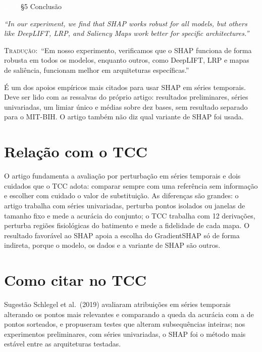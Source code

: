 \documentclass[11pt,a4paper]{article}
\newcommand{\pagechip}[1]{{\setlength{\fboxsep}{1.5pt}\colorbox{cAcc}{\textcolor{white}{\scriptsize\texttt{#1}}}}}
\newenvironment{origquote}{\par\itshape\small}{\par}
\newenvironment{tradquote}{\par\small\textsc{Tradução:}\ }{\par}
\newcommand{\explab}[1]{\par\smallskip{\small\color{cAcc}\textbf{\MakeUppercase{#1}}}\par}
\begin{document}
\begin{citacard}{\pagechip{p. 4} §5 Conclusão}
\begin{origquote}“In our experiment, we find that SHAP works robust for all models, but others like DeepLIFT, LRP, and Saliency Maps work better for specific architectures.”\end{origquote}
\begin{tradquote}“Em nosso experimento, verificamos que o SHAP funciona de forma robusta em todos os modelos, enquanto outros, como DeepLIFT, LRP e mapas de saliência, funcionam melhor em arquiteturas específicas.”\end{tradquote}
\explab{Explicação}
É um dos apoios empíricos mais citados para usar SHAP em séries temporais. Deve ser lido com as ressalvas do próprio artigo: resultados preliminares, séries univariadas, um limiar único e médias sobre dez bases, sem resultado separado para o MIT-BIH. O artigo também não diz qual variante de SHAP foi usada.
\end{citacard}

\section{Relação com o TCC}
O artigo fundamenta a avaliação por perturbação em séries temporais e dois cuidados que o TCC adota: comparar sempre com uma referência sem informação e escolher com cuidado o valor de substituição. As diferenças são grandes: o artigo trabalha com séries univariadas, perturba pontos isolados ou janelas de tamanho fixo e mede a acurácia do conjunto; o TCC trabalha com 12 derivações, perturba regiões fisiológicas do batimento e mede a fidelidade de cada mapa. O resultado favorável ao SHAP apoia a escolha do GradientSHAP só de forma indireta, porque o modelo, os dados e a variante de SHAP são outros.

\section{Como citar no TCC}
\begin{infobox}[ok]{Sugestão}
Schlegel et al.\ (2019) avaliaram atribuições em séries temporais alterando os pontos mais relevantes e comparando a queda da acurácia com a de pontos sorteados, e propuseram testes que alteram subsequências inteiras; nos experimentos preliminares, com séries univariadas, o SHAP foi o método mais estável entre as arquiteturas testadas.
\end{infobox}
\end{document}

